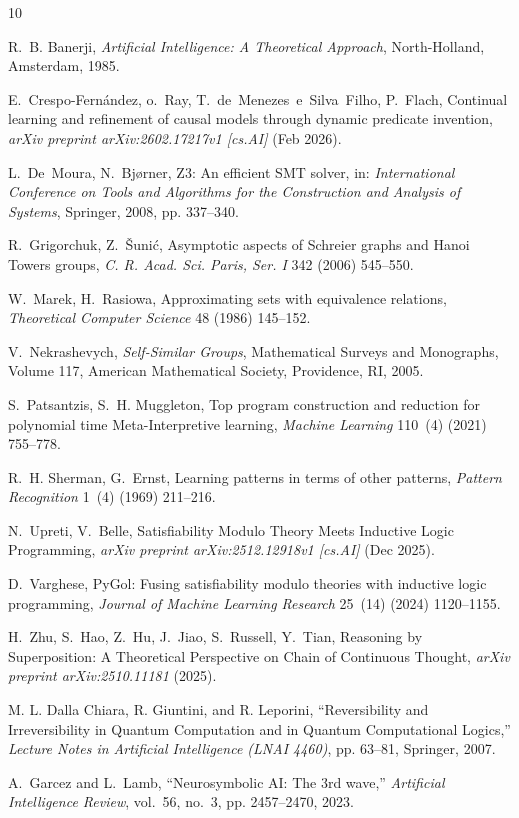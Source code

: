 \documentclass[twocolumn]{article}
\begin{document}

\begin{thebibliography}{10}

R.~B. Banerji, \emph{Artificial Intelligence: A Theoretical Approach}, North-Holland, Amsterdam, 1985.

E.~Crespo-Fern\'{a}ndez, o.~Ray, T.~de~Menezes~e~Silva~Filho, P.~Flach, Continual learning and refinement of causal models through dynamic predicate invention, \emph{arXiv preprint arXiv:2602.17217v1 [cs.AI]} (Feb 2026).

L.~De~Moura, N.~Bj{\o}rner, Z3: An efficient {SMT} solver, in: \emph{International Conference on Tools and Algorithms for the Construction and Analysis of Systems}, Springer, 2008, pp. 337--340.

R.~Grigorchuk, Z.~{\v{S}}uni{\'c}, Asymptotic aspects of Schreier graphs and Hanoi Towers groups, \emph{C. R. Acad. Sci. Paris, Ser. I} 342 (2006) 545--550.

W.~Marek, H.~Rasiowa, Approximating sets with equivalence relations, \emph{Theoretical Computer Science} 48 (1986) 145--152.

V.~Nekrashevych, \emph{Self-Similar Groups}, Mathematical Surveys and Monographs, Volume 117, American Mathematical Society, Providence, RI, 2005.

S.~Patsantzis, S.~H. Muggleton, Top program construction and reduction for polynomial time Meta-Interpretive learning, \emph{Machine Learning} 110~(4) (2021) 755--778.

R.~H. Sherman, G.~Ernst, Learning patterns in terms of other patterns, \emph{Pattern Recognition} 1~(4) (1969) 211--216.

N.~Upreti, V.~Belle, Satisfiability Modulo Theory Meets Inductive Logic Programming, \emph{arXiv preprint arXiv:2512.12918v1 [cs.AI]} (Dec 2025).

D.~Varghese, {PyGol}: Fusing satisfiability modulo theories with inductive logic programming, \emph{Journal of Machine Learning Research} 25~(14) (2024) 1120--1155.

H.~Zhu, S.~Hao, Z.~Hu, J.~Jiao, S.~Russell, Y.~Tian, Reasoning by Superposition: A Theoretical Perspective on Chain of Continuous Thought, \emph{arXiv preprint arXiv:2510.11181} (2025).

M. L. Dalla Chiara, R. Giuntini, and R. Leporini, ``Reversibility and Irreversibility in Quantum Computation and in Quantum Computational Logics,'' \textit{Lecture Notes in Artificial Intelligence (LNAI 4460)}, pp. 63--81, Springer, 2007.

A.~Garcez and L.~Lamb, ``Neurosymbolic {AI}: {T}he 3rd wave,'' \emph{Artificial Intelligence Review}, vol.~56, no.~3, pp. 2457--2470, 2023.

\end{thebibliography}
\end{document}
